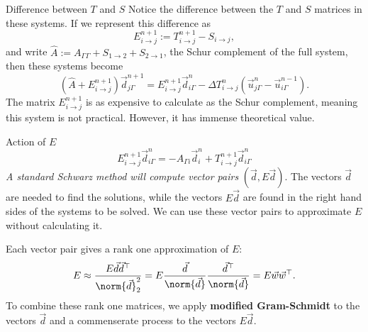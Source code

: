\documentclass{beamer}
\begin{document}
\begin{frame}{Difference between $T$ and $S$}
Notice the difference between the $T$ and $S$ matrices in these systems.
If we represent this difference as
\begin{equation*}
	E_{i \to j}^{n+1} := T_{i \to j}^{n+1} - S_{i \to j},
\end{equation*}
and write $\hat{A} := A_{\Gamma \Gamma} + S_{1 \to 2} + S_{2 \to 1}$, the Schur complement of the full system, then these systems become
\begin{equation*}
	\left ( \hat{A} + E_{i \to j}^{n+1} \right ) \vec{d}_{j \Gamma}^{n+1} = E_{i \to j}^{n+1} \vec{d}_{i \Gamma}^n - \Delta T_{i \to j}^n \left ( \vec{u}_{j \Gamma}^n - \vec{u}_{i \Gamma}^{n-1} \right ).
\end{equation*}
The matrix $E_{i \to j}^{n+1}$ is as expensive to calculate as the Schur complement, meaning this system is not practical.
However, it has immense theoretical value.
\end{frame}

\begin{frame}{Action of $E$}
\begin{equation*}
	E_{i \to j}^{n+1} \vec{d}_{i \Gamma}^n = -A_{\Gamma i} \vec{d}_i^n + T_{i \to j}^{n+1} \vec{d}_{i \Gamma}^n
\end{equation*}
\textit{A standard Schwarz method will compute vector pairs} $\left ( \vec{d}, E \vec{d} \right )$.
The vectors $\vec{d}$ are needed to find the solutions, while the vectors $E \vec{d}$ are found in the right hand sides of the systems to be solved.
We can use these vector pairs to approximate $E$ without calculating it.

Each vector pair gives a rank one approximation of $E$:
\begin{equation*}
	E \approx \frac{E \vec{d} \vec{d}^\top}{\norm{\vec{d}}_2^2} = E \frac{\vec{d}}{\norm{\vec{d}}} \frac{\vec{d}^\top}{\norm{\vec{d}}} = E \vec{w} \vec{w}^\top.
\end{equation*}
To combine these rank one matrices, we apply \textbf{modified Gram-Schmidt} to the vectors $\vec{d}$ and a commenserate process to the vectors $E \vec{d}$.
\end{frame}
\end{document}
